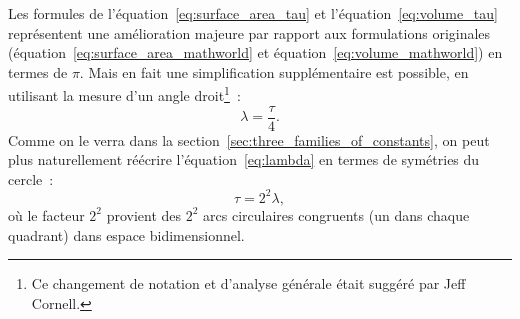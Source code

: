 Les formules de l'équation~\eqref{eq:surface_area_tau} et
l'équation~\eqref{eq:volume_tau} représentent une amélioration majeure par
rapport aux formulations originales
(équation~\eqref{eq:surface_area_mathworld} et
équation~\eqref{eq:volume_mathworld}) en termes de $\pi$. Mais en fait une
simplification supplémentaire est possible, en utilisant la mesure d'un angle
droit\ns\footnote{Ce changement de notation et d'analyse générale était suggéré
par Jeff Cornell.}~:
\begin{equation}
\label{eq:lambda}
\lambda = \frac{\tau}{4}.
\end{equation}
Comme on le verra dans la section~\ref{sec:three_families_of_constants}, on peut
plus naturellement réécrire l'équation~\eqref{eq:lambda} en termes de symétries
du cercle~:
\begin{equation}
\label{eq:tau_lambda}
\tau = 2^2 \lambda,
\end{equation}
où le facteur $2^2$ provient des $2^2$ arcs circulaires congruents (un dans
chaque quadrant) dans espace bidimensionnel.


